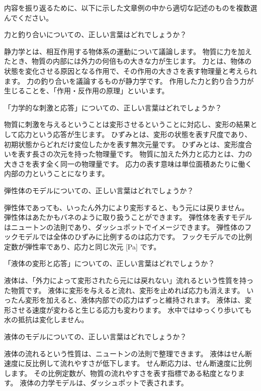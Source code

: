 \documentclass[uplatex,dvipdfmx,a4paper,11pt]{jsarticle}
\begin{document}
内容を振り返るために、以下に示した文章例の中から適切な記述のものを複数選んでください。
	\begin{qlist}
		\qitem 力と釣り合いについての、正しい言葉はどれでしょうか？
		\begin{qlist2}
			\qitem 静力学とは、相互作用する物体系の運動について議論します。
			\qitem 物質に力を加えたとき、物質の内部には外力の何倍もの大きな力が生じます。
			\qitem 力とは、物体の状態を変化させる原因となる作用で、その作用の大きさを表す物理量と考えられます。
			\qitem 力の釣り合いを議論するものが静力学です。
			\qitem 作用した力と釣り合う力が生じることを、「作用・反作用の原理」といいます。
    \end{qlist2}
    \vspace{3mm}
	\qitem 「力学的な刺激と応答」についての、正しい言葉はどれでしょうか？
		\begin{qlist2}
			\qitem 物質に刺激を与えるということは変形させるということに対応し、変形の結果として応力という応答が生じます。
			\qitem ひずみとは、変形の状態を表す尺度であり、初期状態からどれだけ変位したかを表す無次元量です。
			\qitem ひずみとは、変形度合いを表す長さの次元を持った物理量です。
			\qitem 物質に加えた外力と応力とは、力の大きさを表す全く同一の物理量です。
			\qitem 応力の表す意味は単位面積あたりに働く内部の力ということになります。
    \end{qlist2}
    \vspace{3mm}
	\qitem 弾性体のモデルについての、正しい言葉はどれでしょうか？
		\begin{qlist2}
			\qitem 弾性体であっても、いったん外力により変形すると、もう元には戻りません。
			\qitem 弾性体はあたかもバネのように取り扱うことができます。
			\qitem 弾性体を表すモデルはニュートンの法則であり、ダッシュポットでイメージできます。
			\qitem 弾性体のフックモデルでは全体のひずみに比例するのは応力です。
			\qitem フックモデルでの比例定数が弾性率であり、応力と同じ次元 [Pa] です。
    \end{qlist2}
    \vspace{3mm}
	\qitem 「液体の変形と応答」についての、正しい言葉はどれでしょうか？
	\begin{qlist2}
		\qitem 液体は、「外力によって変形されたら元には戻れない」流れるという性質を持った物質です。
		\qitem 液体に変形を与えると流れ、変形を止めれば応力も消えます。
		\qitem いったん変形を加えると、液体内部での応力はずっと維持されます。
		\qitem 液体は、変形させる速度が変わると生じる応力も変わります。
		\qitem 水中ではゆっくり歩いても水の抵抗は変化しません。
  \end{qlist2}
  \vspace{3mm}
	\qitem 液体のモデルについての、正しい言葉はどれでしょうか？
	\begin{qlist2}
		\qitem 液体の流れるという性質は、ニュートンの法則で整理できます。
		\qitem 液体はせん断速度に反比例して流れやすさが低下します。
		\qitem せん断応力は、せん断速度に比例します。
		\qitem その比例定数が、物質の流れやすさを表す指標である粘度となります。
		\qitem 液体の力学モデルは、ダッシュポットで表されます。
	\end{qlist2}
\end{qlist}
\end{document}
